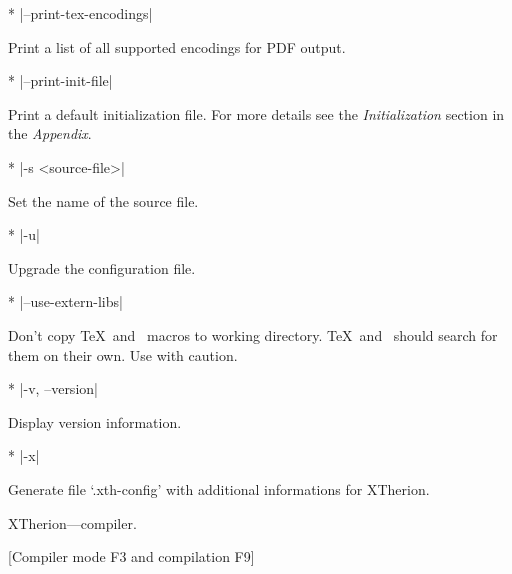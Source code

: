 * |--print-tex-encodings|

        Print a list of all supported encodings for PDF output.
        
* |--print-init-file|

        Print a default initialization file. For more details
        see the {\it Initialization} section in the {\it Appendix}.
        
* |-s <source-file>|

        Set the name of the source file.
        
* |-u|

        Upgrade the configuration file.

* |--use-extern-libs|
  
  Don't copy \TeX\ and \MP\ macros to working directory. \TeX\ and \MP\ 
  should search for them on their own. Use with caution.

* |-v, --version|

  Display version information.        
        
* |-x|

  Generate file `.xth-config' with additional informations for XTherion.
\endoptions

\subsubchapter XTherion---compiler.

[Compiler mode F3 and compilation F9]


\endinput
